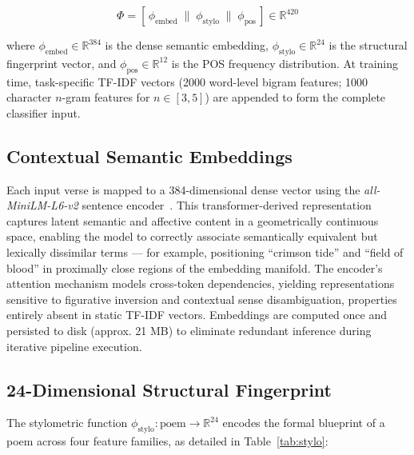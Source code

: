 \documentclass[conference]{IEEEtran}
\begin{document}
\begin{equation}
\Phi = \left[\, \phi_{\text{embed}} \;\|\; \phi_{\text{stylo}} \;\|\;
\phi_{\text{pos}} \,\right] \in \mathbb{R}^{420}
\end{equation}

where $\phi_{\text{embed}} \in \mathbb{R}^{384}$ is the dense semantic
embedding, $\phi_{\text{stylo}} \in \mathbb{R}^{24}$ is the structural
fingerprint vector, and $\phi_{\text{pos}} \in \mathbb{R}^{12}$ is the
POS frequency distribution. At training time, task-specific TF-IDF
vectors (2000 word-level bigram features; 1000 character $n$-gram
features for $n \in [3,5]$) are appended to form the complete classifier
input.

\subsection{Contextual Semantic Embeddings}

Each input verse is mapped to a 384-dimensional dense vector using the
\textit{all-MiniLM-L6-v2} sentence encoder~\cite{reimers2019}. This
transformer-derived representation captures latent semantic and affective
content in a geometrically continuous space, enabling the model to
correctly associate semantically equivalent but lexically dissimilar
terms --- for example, positioning ``crimson tide'' and ``field of blood''
in proximally close regions of the embedding manifold. The encoder's
attention mechanism models cross-token dependencies, yielding
representations sensitive to figurative inversion and contextual sense
disambiguation, properties entirely absent in static TF-IDF vectors.
Embeddings are computed once and persisted to disk (approx. 21 MB) to
eliminate redundant inference during iterative pipeline execution.

\subsection{24-Dimensional Structural Fingerprint}

The stylometric function $\phi_{\text{stylo}}:\text{poem} \to
\mathbb{R}^{24}$ encodes the formal blueprint of a poem across four
feature families, as detailed in Table~\ref{tab:stylo}:
\end{document}
